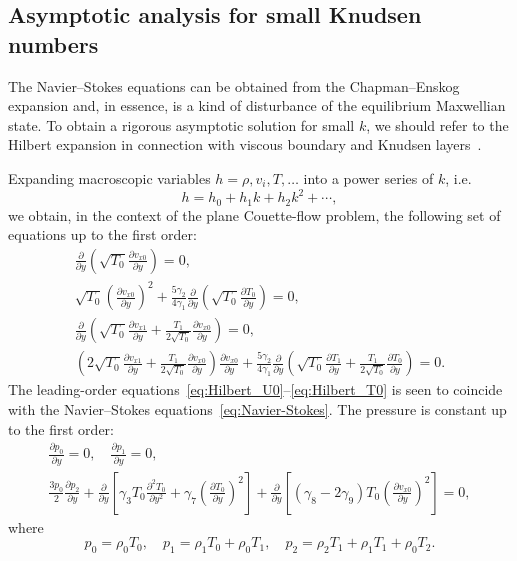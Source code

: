 \documentclass[]{jfm}
\newcommand{\pder}[2][]{\frac{\partial#1}{\partial#2}}
\newcommand{\pderdual}[2][]{\frac{\partial^2#1}{\partial#2^2}}
\begin{document}
\subsection{Asymptotic analysis for small Knudsen numbers}

The Navier--Stokes equations can be obtained from the Chapman--Enskog expansion
and, in essence, is a kind of disturbance of the equilibrium Maxwellian state.
To obtain a rigorous asymptotic solution for small \(k\),
we should refer to the Hilbert expansion in connection with
viscous boundary and Knudsen layers~\citep{Sone2000, Sone2002}.

Expanding macroscopic variables \(h = \rho, v_i, T, \dots\) into a power series of \(k\), i.e.
\begin{equation}\label{eq:hilbert_expansion}
    h = h_0 + h_1k + h_2k^2 + \cdots,
\end{equation}
we obtain, in the context of the plane Couette-flow problem, the following set of equations up to the first order:
\begin{gather}
    \pder{y}\left( \sqrt{T_0}\pder[v_{x0}]{y} \right) = 0, \label{eq:Hilbert_U0}\\
    \sqrt{T_0}\left( \pder[v_{x0}]{y}\right)^2 + \frac{5\gamma_2}{4\gamma_1}\pder{y}\left(\sqrt{T_0}\pder[T_0]{y} \right) = 0, \label{eq:Hilbert_T0}\\
    \pder{y}\left( \sqrt{T_0}\pder[v_{x1}]{y} + \frac{T_1}{2\sqrt{T_0}}\pder[v_{x0}]{y} \right) = 0, \label{eq:Hilbert_U1}\\
    \left( 2\sqrt{T_0}\pder[v_{x1}]{y} + \frac{T_1}{2\sqrt{T_0}}\pder[v_{x0}]{y} \right) \pder[v_{x0}]{y}
        + \frac{5\gamma_2}{4\gamma_1} \pder{y}\left( \sqrt{T_0}\pder[T_1]{y} + \frac{T_1}{2\sqrt{T_0}}\pder[T_0]{y} \right) = 0. \label{eq:Hilbert_T1}
\end{gather}
The leading-order equations~\eqref{eq:Hilbert_U0}--\eqref{eq:Hilbert_T0}
is seen to coincide with the Navier--Stokes equations~\eqref{eq:Navier-Stokes}.
The pressure is constant up to the first order:
\begin{gather}
    \pder[p_0]{y} = 0, \quad \pder[p_1]{y} = 0, \label{eq:hilbert_p0_p1} \\
    \frac{3p_0}{2}\pder[p_2]{y}
        + \pder{y}\left[ \gamma_3 T_0 \pderdual[T_0]{y} + \gamma_7\left(\pder[T_0]{y}\right)^2 \right]
        + \pder{y}\left[ (\gamma_8-2\gamma_9)T_0\left(\pder[v_{x0}]{y}\right)^2 \right] = 0, \label{eq:hilbert_p2}
\end{gather}
where
\begin{equation}\label{eq:hilbert_expansion_p}
    p_0 = \rho_0 T_0, \quad
    p_1 = \rho_1 T_0 + \rho_0 T_1, \quad
    p_2 = \rho_2 T_1 + \rho_1 T_1 + \rho_0 T_2.
\end{equation}
\end{document}

